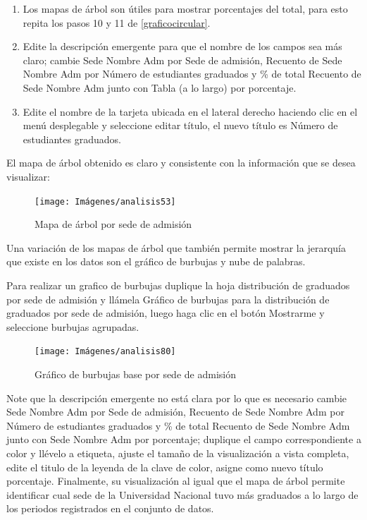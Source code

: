 \documentclass[
]{book}
\begin{document}
\begin{enumerate}
\def\labelenumi{\arabic{enumi}.}
\setcounter{enumi}{5}
\item
  Los mapas de árbol son útiles para mostrar porcentajes del total, para esto repita los pasos 10 y 11 de \ref{graficocircular}.
\item
  Edite la descripción emergente para que el nombre de los campos sea más claro; cambie Sede Nombre Adm por Sede de admisión, Recuento de Sede Nombre Adm por Número de estudiantes graduados y \% de total Recuento de Sede Nombre Adm junto con Tabla (a lo largo) por porcentaje.
\item
  Edite el nombre de la tarjeta ubicada en el lateral derecho haciendo clic en el menú desplegable y seleccione editar título, el nuevo título es Número de estudiantes graduados.
\end{enumerate}

El mapa de árbol obtenido es claro y consistente con la información que se desea visualizar:

\begin{figure}

{\centering \texttt{[image: Imágenes/analisis53]} 

}

\caption{Mapa de árbol por sede de admisión}\label{fig:mapaarbol-fig}
\end{figure}

Una variación de los mapas de árbol que también permite mostrar la jerarquía que existe en los datos son el gráfico de burbujas y nube de palabras.

Para realizar un grafico de burbujas duplique la hoja distribución de graduados por sede de admisión y llámela Gráfico de burbujas para la distribución de graduados por sede de admisión, luego haga clic en el botón Mostrarme y seleccione burbujas agrupadas.

\begin{figure}

{\centering \texttt{[image: Imágenes/analisis80]} 

}

\caption{Gráfico de burbujas base por sede de admisión}\label{fig:1burbujas-fig}
\end{figure}

Note que la descripción emergente no está clara por lo que es necesario cambie Sede Nombre Adm por Sede de admisión, Recuento de Sede Nombre Adm por Número de estudiantes graduados y \% de total Recuento de Sede Nombre Adm junto con Sede Nombre Adm por porcentaje; duplique el campo correspondiente a color y llévelo a etiqueta, ajuste el tamaño de la visualización a vista completa, edite el titulo de la leyenda de la clave de color, asigne como nuevo título porcentaje. Finalmente, su visualización al igual que el mapa de árbol permite identificar cual sede de la Universidad Nacional tuvo más graduados a lo largo de los periodos registrados en el conjunto de datos.
\end{document}
